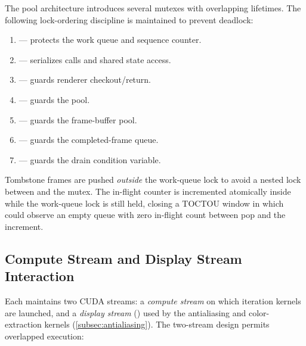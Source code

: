 The pool architecture introduces several mutexes with overlapping
lifetimes.  The following lock-ordering discipline is maintained to
prevent deadlock:
\begin{enumerate}
  \item {} --- protects the work queue and
        sequence counter.
  \item {} --- serializes
         calls and shared  state
        access.
  \item {} --- guards renderer
        checkout/return.
  \item {} --- guards the
         pool.
  \item {} --- guards the 
        frame-buffer pool.
  \item {} --- guards the
        completed-frame queue.
  \item {} --- guards the drain condition
        variable.
\end{enumerate}
Tombstone frames are pushed \emph{outside} the work-queue lock to
avoid a nested lock between  and the
 mutex.  The in-flight counter
 is incremented atomically inside
 while the work-queue lock is still held,
closing a TOCTOU window in which  could observe an
empty queue with zero in-flight count between pop and the
increment.

\subsection{Compute Stream and Display Stream Interaction}
\label{subsec:stream-interaction}

Each  maintains two CUDA streams: a
\emph{compute stream} on which iteration kernels are launched,
and a \emph{display stream} () used by the
antialiasing and color-extraction kernels
(\cref{subsec:antialiasing}).  The two-stream design permits
overlapped execution:

